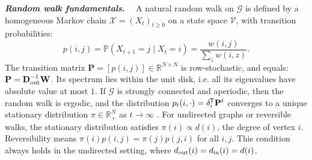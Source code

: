 \documentclass[10pt]{article} %
\makeatletter
\def\rmD{{\mathbf{D}}}
\def\rmP{{\mathbf{P}}}
\def\rmW{{\mathbf{W}}}
\def\gV{{\mathcal{V}}}
\renewcommand*{\top}{{\mkern-1.4mu\mathsf{T}}}
\newcommand{\inlinetitle}[2]{\noindent\textbf{\textit{#1}{#2}}~~}
\newcommand{\ie}   			{i.e.\@\xspace}
\makeatother
\begin{document}
\inlinetitle{Random walk fundamentals}{.}%
A natural random walk on $\mathcal{G}$ is defined by a homogeneous Markov chain $\mathcal{X} = (X_t)_{t \geq 0}$ on a state space $\gV$, with transition probabilities:
\begin{equation}
  p(i,j) = \mathbb{P}(X_{t+1} = j \mid X_t = i) = \frac{w(i,j)}{\sum_z w(i,z)}.
\end{equation}
The transition matrix $\rmP = [p(i,j)] \in \mathbb{R}^{N \times N}$ is row-stochastic, and equals: $\rmP = \rmD_{\textnormal{out}}^{-1} \rmW$. Its spectrum lies within the unit disk, \ie all its eigenvalues have absolute value at most $1$.
%
If $\mathcal{G}$ is strongly connected and aperiodic, then the random walk is ergodic, and the distribution $p_t(i, \cdot) = \delta_i^\top \rmP^t$ converges to a unique stationary distribution $\pi \in \mathbb{R}_+^N$ as $t \to \infty$ \citep{bremaud2013markov}.
%
For undirected graphs or reversible walks, the stationary distribution satisfies $\pi(i) \propto d(i)$, the degree of vertex $i$. Reversibility means $\pi(i) p(i,j) = \pi(j) p(j,i)$ for all $i,j$. This condition always holds in the undirected setting, where $d_{\textnormal{out}}(i) = d_{\textnormal{in}}(i) = d(i)$.
\end{document}
